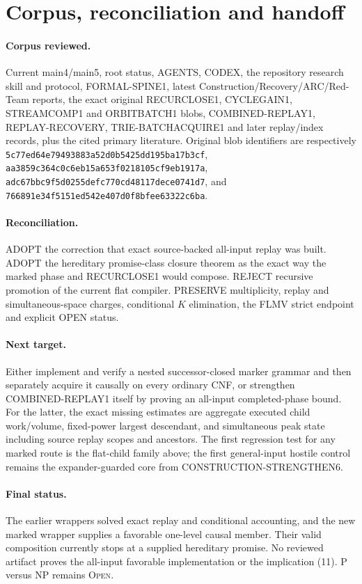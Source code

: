 \documentclass[11pt]{article}
\begin{document}
\section{Corpus, reconciliation and handoff}
\paragraph{Corpus reviewed.}
Current main4/main5, root status, AGENTS, CODEX, the repository research skill
and protocol, FORMAL-SPINE1, latest Construction/Recovery/ARC/Red-Team reports,
the exact original RECURCLOSE1, CYCLEGAIN1, STREAMCOMP1 and ORBITBATCH1 blobs,
COMBINED-REPLAY1, REPLAY-RECOVERY, TRIE-BATCHACQUIRE1 and later replay/index
records, plus the cited primary literature.  Original blob identifiers are
respectively
\nolinkurl{5c77ed64e79493883a52d0b5425dd195ba17b3cf},
\nolinkurl{aa3859c364c0c6eb15a653f0218105cf9eb1917a},
\nolinkurl{adc67bbc9f5d0255defc770cd48117dece0741d7}, and
\nolinkurl{766891e34f5151ed542e407d0f8bfee63322c6ba}.

\paragraph{Reconciliation.}
ADOPT the correction that exact source-backed all-input replay was built.
ADOPT the hereditary promise-class closure theorem as the exact way the marked
phase and RECURCLOSE1 would compose.  REJECT recursive promotion of the
current flat compiler.  PRESERVE multiplicity, replay and simultaneous-space
charges, conditional $K$ elimination, the FLMV strict endpoint and explicit
OPEN status.

\paragraph{Next target.}
Either implement and verify a nested successor-closed marker grammar and then
separately acquire it causally on every ordinary CNF, or strengthen
COMBINED-REPLAY1 itself by proving an all-input completed-phase bound.  For the
latter, the exact missing estimates are aggregate executed child work/volume,
fixed-power largest descendant, and simultaneous peak state including source
replay scopes and ancestors.  The first regression test for any marked route
is the flat-child family above; the first general-input hostile control remains
the expander-guarded core from CONSTRUCTION-STRENGTHEN6.

\paragraph{Final status.}
The earlier wrappers solved exact replay and conditional accounting, and the
new marked wrapper supplies a favorable one-level causal member.  Their valid
composition currently stops at a supplied hereditary promise.  No reviewed
artifact proves the all-input favorable implementation or the implication
(11).  P versus NP remains \textsc{Open}.

\end{document}
